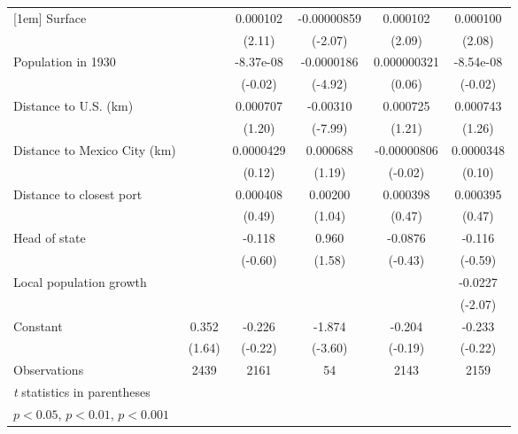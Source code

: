 {\begin{tabular}{l*{5}{c}}
[1em]
Surface             &                     &    0.000102\sym{*}  & -0.00000859\sym{*}  &    0.000102\sym{*}  &    0.000100\sym{*}  \\
                    &                     &      (2.11)         &     (-2.07)         &      (2.09)         &      (2.08)         \\
[1em]
Population in 1930  &                     &   -8.37e-08         &  -0.0000186\sym{***}& 0.000000321         &   -8.54e-08         \\
                    &                     &     (-0.02)         &     (-4.92)         &      (0.06)         &     (-0.02)         \\
[1em]
Distance to U.S. (km)&                     &    0.000707         &    -0.00310\sym{***}&    0.000725         &    0.000743         \\
                    &                     &      (1.20)         &     (-7.99)         &      (1.21)         &      (1.26)         \\
[1em]
Distance to Mexico City (km)&                     &   0.0000429         &    0.000688         & -0.00000806         &   0.0000348         \\
                    &                     &      (0.12)         &      (1.19)         &     (-0.02)         &      (0.10)         \\
[1em]
Distance to closest port&                     &    0.000408         &     0.00200         &    0.000398         &    0.000395         \\
                    &                     &      (0.49)         &      (1.04)         &      (0.47)         &      (0.47)         \\
[1em]
Head of state       &                     &      -0.118         &       0.960         &     -0.0876         &      -0.116         \\
                    &                     &     (-0.60)         &      (1.58)         &     (-0.43)         &     (-0.59)         \\
[1em]
Local population growth&                     &                     &                     &                     &     -0.0227\sym{*}  \\
                    &                     &                     &                     &                     &     (-2.07)         \\
[1em]
Constant            &       0.352         &      -0.226         &      -1.874\sym{***}&      -0.204         &      -0.233         \\
                    &      (1.64)         &     (-0.22)         &     (-3.60)         &     (-0.19)         &     (-0.22)         \\
\hline
Observations        &        2439         &        2161         &          54         &        2143         &        2159         \\
\hline\hline
\multicolumn{6}{l}{\footnotesize \textit{t} statistics in parentheses}\\
\multicolumn{6}{l}{\footnotesize \sym{*} \(p<0.05\), \sym{**} \(p<0.01\), \sym{***} \(p<0.001\)}\\
\end{tabular}
}
